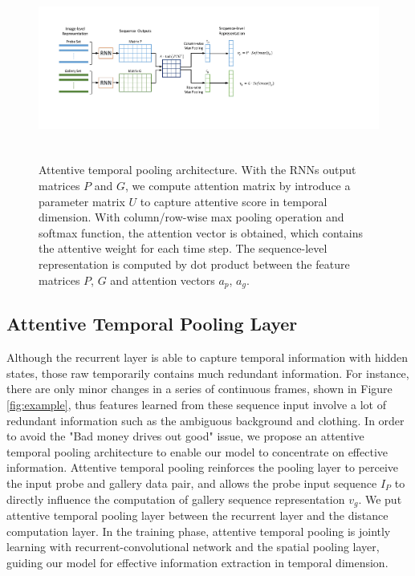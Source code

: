 \documentclass[10pt,twocolumn,letterpaper]{article}
\begin{document}
\begin{figure}[!t]
\centering
\includegraphics[height=6cm]{Temporal.pdf}
\caption{Attentive temporal pooling architecture. With the RNNs output matrices $P$ and $G$, we compute attention matrix by introduce a parameter matrix $U$ to capture attentive score in temporal dimension. With column/row-wise max pooling operation and softmax function, the attention vector is obtained, which contains the attentive weight for each time step. The sequence-level representation is computed by dot product between the feature matrices $P$, $G$ and attention vectors $a_p$, $a_g$.}
\label{fig_temporal}
\end{figure}

\subsection{Attentive Temporal Pooling Layer}

Although the recurrent layer is able to capture temporal information with hidden states, those raw temporarily contains much redundant information. For instance, there are only minor changes in a series of continuous frames, shown in Figure \ref{fig:example}, thus features learned from these sequence input involve a lot of redundant information such as the ambiguous background and clothing. In order to avoid the "Bad money drives out good" issue, we propose an attentive temporal pooling architecture to enable our model to concentrate on effective information. Attentive temporal pooling reinforces the pooling layer to perceive the input probe and gallery data pair, and allows the probe input sequence ${I_P}$ to directly influence the computation of gallery sequence representation $v_g$. We put attentive temporal pooling layer between the recurrent layer and the distance computation layer. In the training phase, attentive temporal pooling is jointly learning with recurrent-convolutional network and the spatial pooling layer, guiding our model for effective information extraction in temporal dimension.
\end{document}
